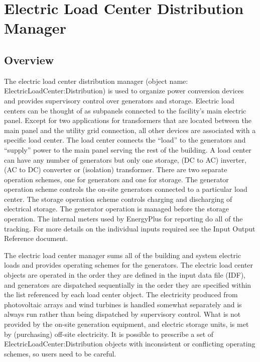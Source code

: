 \section{Electric Load Center Distribution Manager}\label{electric-load-center-distribution-manager}

\subsection{Overview}\label{overview-016}

The electric load center distribution manager (object name: ElectricLoadCenter:Distribution) is used to organize power conversion devices and provides supervisory control over generators and storage.   Electric load centers can be thought of as subpanels connected to the facility's main electric panel.  Except for two applications for transformers that are located between the main panel and the utility grid connection, all other devices are associated with a specific load center.  The load center connects the “load” to the generators and “supply” power to the main panel serving the rest of the building.  A load center can have any number of generators but only one storage, (DC to AC) inverter, (AC to DC) converter or (isolation) transformer.  There are two separate operation schemes, one for generators and one for storage.  The generator operation scheme controls the on-site generators connected to a particular load center.  The storage operation scheme controls charging and discharging of electrical storage.  The generator operation is managed before the storage operation.  The internal meters used by EnergyPlus for reporting do all of the tracking. For more details on the individual inputs required see the Input Output Reference document.

The electric load center manager sums all of the building and system electric loads and provides operating schemes for the generators. The electric load center objects are operated in the order they are defined in the input data file (IDF), and generators are dispatched sequentially in the order they are specified within the list referenced by each load center object. The electricity produced from photovoltaic arrays and wind turbines is handled somewhat separately and is always run rather than being dispatched by supervisory control.  What is not provided by the on-site generation equipment, and electric storage units, is met by (purchasing) off-site electricity. It is possible to prescribe a set of ElectricLoadCenter:Distribution objects with inconsistent or conflicting operating schemes, so users need to be careful.

